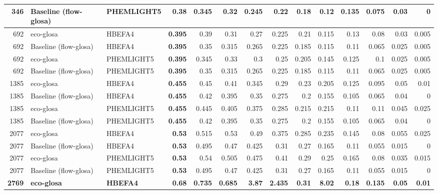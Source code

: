 \begin{table}[htb]
{\begin{tabular}{r l l r *{10}{r}}
    346 & Baseline (\ac{flow-glosa}) & PHEMLIGHT5 & \textbf{0.38} & 0.345 & 0.32 & 0.245 & 0.22 & 0.18 & 0.12 & 0.135 & 0.075 & 0.03 & 0\\
    \midrule
    692 & \ac{eco-glosa} & HBEFA4 & \textbf{0.395} & 0.39 & 0.31 & 0.27 & 0.225 & 0.21 & 0.115 & 0.13 & 0.08 & 0.03 & 0.005\\
    692 & Baseline (\ac{flow-glosa}) & HBEFA4 & \textbf{0.395} & 0.35 & 0.315 & 0.265 & 0.225 & 0.185 & 0.115 & 0.11 & 0.065 & 0.025 & 0.005\\
    692 & \ac{eco-glosa} & PHEMLIGHT5 & \textbf{0.395} & 0.345 & 0.33 & 0.3 & 0.25 & 0.205 & 0.145 & 0.125 & 0.1 & 0.025 & 0.005\\
    692 & Baseline (\ac{flow-glosa}) & PHEMLIGHT5 & \textbf{0.395} & 0.35 & 0.315 & 0.265 & 0.225 & 0.185 & 0.115 & 0.11 & 0.065 & 0.025 & 0.005\\
    \midrule
    1385 & \ac{eco-glosa} & HBEFA4 & \textbf{0.455} & 0.45 & 0.41 & 0.345 & 0.29 & 0.23 & 0.205 & 0.125 & 0.095 & 0.05 & 0.01\\
    1385 & Baseline (\ac{flow-glosa}) & HBEFA4 & \textbf{0.455} & 0.42 & 0.395 & 0.35 & 0.275 & 0.2 & 0.155 & 0.105 & 0.065 & 0.04 & 0\\
    1385 & \ac{eco-glosa} & PHEMLIGHT5 & \textbf{0.455} & 0.445 & 0.405 & 0.375 & 0.285 & 0.215 & 0.215 & 0.11 & 0.11 & 0.045 & 0.025\\
    1385 & Baseline (\ac{flow-glosa}) & PHEMLIGHT5 & \textbf{0.455} & 0.42 & 0.395 & 0.35 & 0.275 & 0.2 & 0.155 & 0.105 & 0.065 & 0.04 & 0\\
    \midrule
    2077 & \ac{eco-glosa} & HBEFA4 & \textbf{0.53} & 0.515 & 0.53 & 0.49 & 0.375 & 0.285 & 0.235 & 0.145 & 0.08 & 0.055 & 0.025\\
    2077 & Baseline (\ac{flow-glosa}) & HBEFA4 & \textbf{0.53} & 0.495 & 0.47 & 0.425 & 0.31 & 0.27 & 0.165 & 0.11 & 0.055 & 0.015 & 0\\
    2077 & \ac{eco-glosa} & PHEMLIGHT5 & \textbf{0.53} & 0.54 & 0.505 & 0.475 & 0.41 & 0.29 & 0.25 & 0.165 & 0.08 & 0.035 & 0.015\\
    2077 & Baseline (\ac{flow-glosa}) & PHEMLIGHT5 & \textbf{0.53} & 0.495 & 0.47 & 0.425 & 0.31 & 0.27 & 0.165 & 0.11 & 0.055 & 0.015 & 0\\
    \midrule
    \textbf{2769} & \textbf{\ac{eco-glosa}} & \textbf{HBEFA4} & \textbf{0.68} & \textbf{0.735} & \textbf{0.685} & \textbf{3.87} & \textbf{2.435} & \textbf{0.31} & \textbf{8.02} & \textbf{0.18} & \textbf{0.135} & \textbf{0.05} & \textbf{0.01}\\

\end{tabular}}
\end{table}

